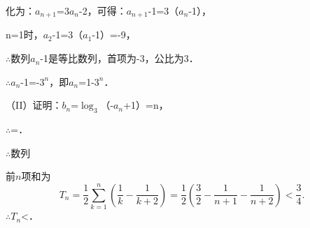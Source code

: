 化为：\ensuremath{a_{n+1}}=3\ensuremath{a_{n}}-2，可得：\ensuremath{a_{n+1}}-1=3（\ensuremath{a_{n}}-1），\par
n=1时，\ensuremath{a_{2}}-1=3（\ensuremath{a_{1}}-1）=-9，\par
\ensuremath{\therefore}数列{\ensuremath{a_{n}}-1}是等比数列，首项为-3，公比为3．\par
\ensuremath{\therefore}\ensuremath{a_{n}}-1=-\ensuremath{3^{n}}，即\ensuremath{a_{n}}=1-\ensuremath{3^{n}}．\par
（II）证明：\ensuremath{b_{n}}=\ensuremath{\log_{3}}（-\ensuremath{a_{n}}+1）=n，\par
\ensuremath{\therefore}=．\par
\ensuremath{\therefore}数列{}\par
前$n$项和为
\[
T_n=\frac12\sum_{k=1}^{n}\left(\frac1k-\frac1{k+2}\right)
=\frac12\left(\frac32-\frac1{n+1}-\frac1{n+2}\right)
<\frac34.
\]
\ensuremath{\therefore}\ensuremath{T_{n}}<．\par
\par\endgroup\fi

